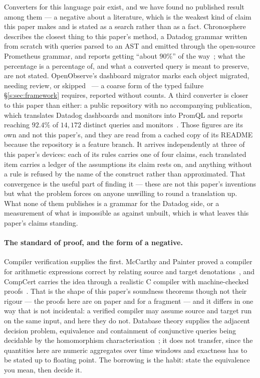 Converters for this language pair exist, and we have found no published result among them
--- a negative about a literature, which is the weakest kind of claim this paper makes and
is stated as a search rather than as a fact. Chronosphere describes the closest thing to
this paper's method, a Datadog grammar written from scratch with queries parsed to an AST
and emitted through the open-source Prometheus grammar, and reports getting ``about
$90\%$'' of the way~\citep{marcopoli2024}; what the percentage is a percentage of, and what
a converted query is meant to preserve, are not stated. OpenObserve's dashboard migrator
marks each object migrated, needing review, or skipped~\citep{openobserve} --- a coarse
form of the typed failure \S\ref{s:sec:framework} requires, reported without counts. A
third converter is closer to this paper than either: a public repository with no
accompanying publication, which translates Datadog dashboards and monitors into PromQL and
reports reaching $92.4\%$ of $14{,}172$ distinct queries and monitors~\citep{dd2dash0}.
Those figures are its own and not this paper's, and they are read from a cached copy of its
README because the repository is a feature branch. It arrives independently at three of
this paper's devices: each of its rules carries one of four claims, each translated item
carries a ledger of the assumptions its claim rests on, and anything without a rule is
refused by the name of the construct rather than approximated. That convergence is the
useful part of finding it --- these are not this paper's inventions but what the problem
forces on anyone unwilling to round a translation up. What none of them publishes is a
grammar for the Datadog side, or a measurement of what is impossible as against unbuilt,
which is what leaves this paper's claims standing.

\paragraph{The standard of proof, and the form of a negative.}
Compiler verification supplies the first. McCarthy and Painter proved a compiler for
arithmetic expressions correct by relating source and target denotations~\citep{mccarthy1967},
and CompCert carries the idea through a realistic C compiler with machine-checked
proofs~\citep{leroy2009}. That is the shape of this paper's soundness theorems though not
their rigour --- the proofs here are on paper and for a fragment --- and it differs in one
way that is not incidental: a verified compiler may assume source and target run on the
same input, and here they do not. Database theory supplies the adjacent decision problem,
equivalence and containment of conjunctive queries being decidable by the homomorphism
characterisation~\citep{chandra1977,abiteboul1995}; it does not transfer, since the
quantities here are numeric aggregates over time windows and exactness has to be stated up
to floating point. The borrowing is the habit: state the equivalence you mean, then decide
it.


